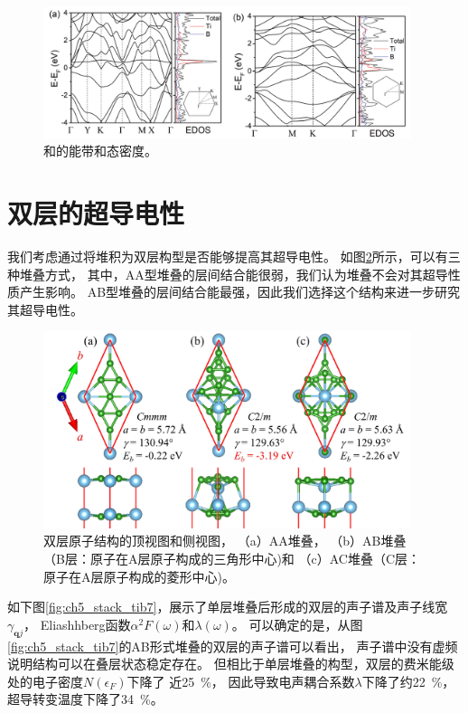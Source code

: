 \begin{figure}[htb]
    \includegraphics[width=0.96\textwidth]{figs/ch5_bands.png}
    \centering
    \caption{和的能带和态密度。}
    \label{fig:ch5_bands}
\end{figure}

\section{双层的超导电性}
我们考虑通过将堆积为双层构型是否能够提高其超导电性。
如图\ref{fig:stack-kinds}所示，可以有三种堆叠方式，
其中，AA型堆叠的层间结合能很弱，我们认为堆叠不会对其超导性质产生影响。
AB型堆叠的层间结合能最强，因此我们选择这个结构来进一步研究其超导电性。

\begin{figure}[H]
  \includegraphics[width=0.96\textwidth]{figs/stack-kinds.png}
  \centering
  \caption{双层原子结构的顶视图和侧视图，
  （a）AA堆叠，
  （b）AB堆叠（B层：原子在A层原子构成的三角形中心)和
  （c）AC堆叠（C层：原子在A层原子构成的菱形中心)。}
  \label{fig:stack-kinds}
\end{figure}

如下图\ref{fig:ch5_stack_tib7}，展示了单层堆叠后形成的双层的声子谱及声子线宽$\gamma_{\bm{q}j}$，
Eliashhberg函数$\alpha^2 F(\omega)$和$\lambda(\omega)$。
可以确定的是，从图\ref{fig:ch5_stack_tib7}的AB形式堆叠的双层的声子谱可以看出，
声子谱中没有虚频说明结构可以在叠层状态稳定存在。
但相比于单层堆叠的构型，双层的费米能级处的电子密度$N(\epsilon_F)$下降了
近\SI{25}{\percent}，
因此导致电声耦合系数$\lambda$下降了约\SI{22}{\percent}，
超导转变温度下降了\SI{34}{\percent}。

